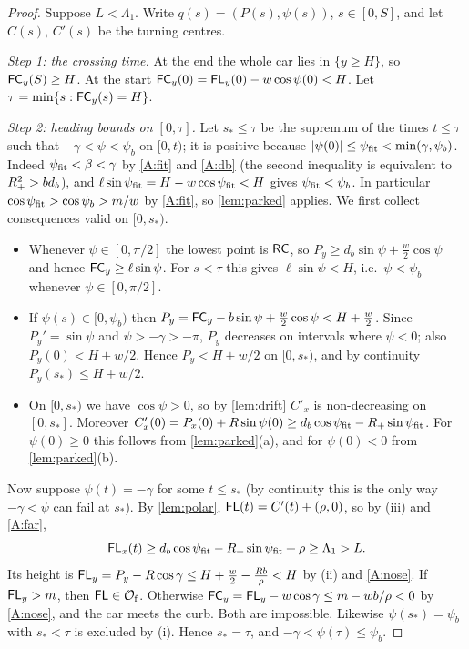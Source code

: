 \begin{proof}
Suppose $L<\Lambda_1$.
Write $q(s)=(P(s),\psi(s))$, $s\in[0,S]$, and let $C(s)$, $C'(s)$ be the turning centres.

\emph{Step 1: the crossing time.}
At the end the whole car lies in $\{y\ge H\}$, so $\mathsf{FC}_y(S)\ge H$.
At the start $\mathsf{FC}_y(0)=\mathsf{FL}_y(0)-w\cos\psi(0)<H$.
Let $\tau=\min\{s:\mathsf{FC}_y(s)=H\}$.

\emph{Step 2: heading bounds on $[0,\tau]$.}
Let $s_*\le\tau$ be the supremum of the times $t\le\tau$ such that $-\gamma<\psi<\psi_b$ on $[0,t)$; it is positive because $|\psi(0)|\le\psi_{\rm fit}<\min(\gamma,\psi_b)$.
Indeed $\psi_{\rm fit}<\beta<\gamma$ by \ref{A:fit} and \ref{A:db} (the second inequality is equivalent to $R_{+}^2>bd_b$), and $\ell\sin\psi_{\rm fit}=H-w\cos\psi_{\rm fit}<H$ gives $\psi_{\rm fit}<\psi_b$.
In particular $\cos\psi_{\rm fit}>\cos\psi_b>m/w$ by \ref{A:fit}, so \cref{lem:parked} applies.
We first collect consequences valid on $[0,s_*)$.
\begin{itemize}
\item[(i)] Whenever $\psi\in[0,\pi/2]$ the lowest point is $\mathsf{RC}$, so $P_y\ge d_b\sin\psi+\tfrac w2\cos\psi$ and hence $\mathsf{FC}_y\ge\ell\sin\psi$.
For $s<\tau$ this gives $\ell\sin\psi<H$, i.e.\ $\psi<\psi_b$ whenever $\psi\in[0,\pi/2]$.
\item[(ii)] If $\psi(s)\in[0,\psi_b)$ then $P_y=\mathsf{FC}_y-b\sin\psi+\tfrac w2\cos\psi<H+\tfrac w2$.
Since $P_y'=\sin\psi$ and $\psi>-\gamma>-\pi$, $P_y$ decreases on intervals where $\psi<0$; also $P_y(0)<H+w/2$.
Hence $P_y<H+w/2$ on $[0,s_*)$, and by continuity $P_y(s_*)\le H+w/2$.
\item[(iii)] On $[0,s_*)$ we have $\cos\psi>0$, so by \cref{lem:drift} $C'_x$ is non-decreasing on $[0,s_*]$.
Moreover $C'_x(0)=P_x(0)+R\sin\psi(0)\ge d_b\cos\psi_{\rm fit}-R_{+}\sin\psi_{\rm fit}$.
For $\psi(0)\ge0$ this follows from \cref{lem:parked}(a), and for $\psi(0)<0$ from \cref{lem:parked}(b).
\end{itemize}
Now suppose $\psi(t)=-\gamma$ for some $t\le s_*$ (by continuity this is the only way $-\gamma<\psi$ can fail at $s_*$).
By \cref{lem:polar}, $\mathsf{FL}(t)=C'(t)+(\rho,0)$, so by (iii) and \ref{A:far},
\[
  \mathsf{FL}_x(t)\ge d_b\cos\psi_{\rm fit}-R_{+}\sin\psi_{\rm fit}+\rho\ge\Lambda_1>L .
\]
Its height is $\mathsf{FL}_y=P_y-R\cos\gamma\le H+\tfrac w2-\tfrac{Rb}\rho<H$ by (ii) and \ref{A:nose}.
If $\mathsf{FL}_y>m$, then $\mathsf{FL}\in\mathcal{O}_{\mathrm f}$.
Otherwise $\mathsf{FC}_y=\mathsf{FL}_y-w\cos\gamma\le m-wb/\rho<0$ by \ref{A:nose}, and the car meets the curb.
Both are impossible.
Likewise $\psi(s_*)=\psi_b$ with $s_*<\tau$ is excluded by (i).
Hence $s_*=\tau$, and $-\gamma<\psi(\tau)\le\psi_b$.


\end{proof}
